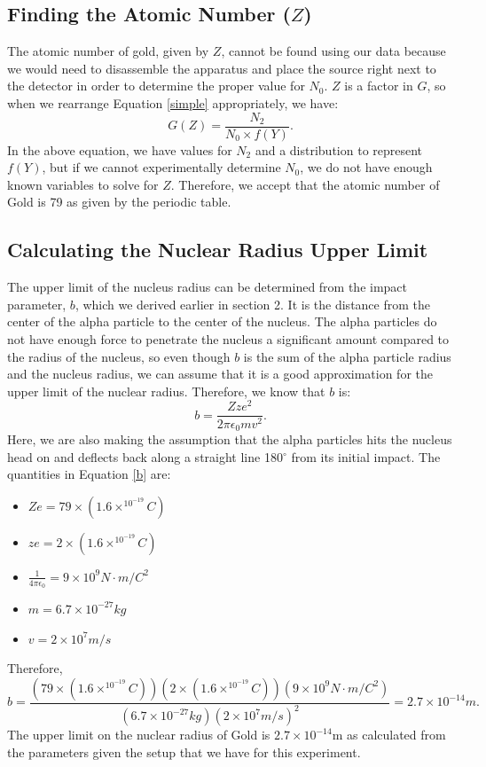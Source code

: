 \subsection{Finding the Atomic Number ($Z$)}
The atomic number of gold, given by $Z$, cannot be found using our data because we would need to disassemble the apparatus and place the source right next to the detector in order to determine the proper value for $N_0$. $Z$ is a factor in $G$, so when we rearrange Equation \ref{simple} appropriately, we have: 
\begin{equation}G(Z)= \frac{N_2}{N_0 \times f(Y)}. \end {equation} 
In the above equation, we have values for $N_2$ and a distribution to represent $f(Y)$, but if we cannot experimentally determine $N_0$,  we do not have enough known variables to solve for $Z$. Therefore, we accept that the atomic number of Gold is 79 as given by the periodic table. 
\subsection{Calculating the Nuclear Radius Upper Limit}
The upper limit of the nucleus radius can be determined from the impact parameter, $b$, which we derived earlier in section 2. It is the distance from the center of the alpha particle to the center of the nucleus. The alpha particles do not have enough force to penetrate the nucleus a significant amount compared to the radius of the nucleus, so even though $b$ is the sum of the alpha particle radius and the nucleus radius, we can assume that it is a good approximation for the upper limit of the nuclear radius. Therefore, we know that $b$ is: \begin{equation} \label{b}b= \frac{Zze^2}{2\pi \epsilon_0 mv^2}.\end{equation} Here, we are also making the assumption that the alpha particles hits the nucleus head on and deflects back along a straight line 180$^\circ$ from its initial impact. The quantities in Equation \ref{b} are:
\begin{itemize}
\item $Ze=79\times (1.6\times^10^{-19} C)$
\item $ze= 2\times(1.6\times^10^{-19} C)$
\item $\frac{1}{4\pi\epsilon_0}=9\times10^9 N\cdot m/ C^2$
\item $m=6.7\times10^{-27} kg$
\item $v=2\times 10^7 m/s$
\end{itemize}
Therefore, \begin{equation} b= \frac{(79\times (1.6\times^10^{-19} C))(2\times(1.6\times^10^{-19} C))(9\times10^9 N\cdot m/ C^2)}{(6.7\times10^{-27} kg)(2\times 10^7 m/s)^2}=2.7\times10^{-14}m.\end{equation}
The upper limit on the nuclear radius of Gold is $2.7\times10^{-14}$m as calculated from the parameters given the setup that we have for this experiment.


